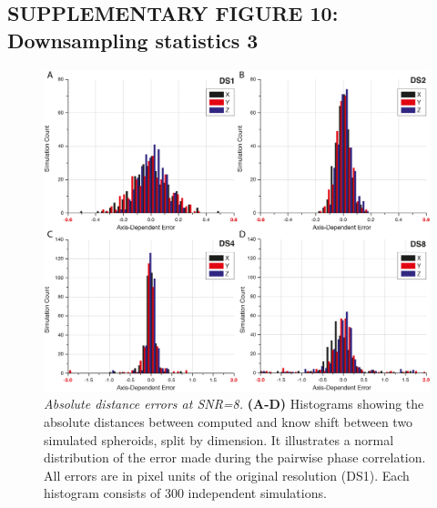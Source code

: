 \documentclass[]{spie}  %
\begin{document}
\pagebreak

\subsection*{SUPPLEMENTARY FIGURE 10: Downsampling statistics 3}
\vspace{1mm}
\begin{figure}[h!]
\includegraphics[width=\textwidth]{fig-downsampling-statistics-2.png}
\vspace{-2.0mm}
\caption{\hspace{-0.5mm} \emph{Absolute distance errors at SNR=8.} \textbf{(A-D)}  Histograms showing the absolute distances between computed and know shift between two simulated spheroids, split by dimension. It illustrates a normal distribution of the error made during the pairwise phase correlation. All errors are in pixel units of the original resolution (DS1). Each histogram consists of 300 independent simulations.
}
\label{fig:sup-fig-downsampling-statistics-2}
\end{figure}

\pagebreak
\end{document}
